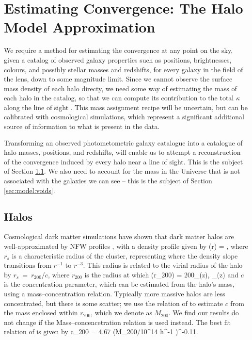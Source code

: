 \documentclass[useAMS,usenatbib]{mn2e}
\begin{document}



\section{Estimating Convergence: The Halo Model Approximation}
\label{sec:model}

We require a method for estimating the
convergence at any point on the sky, given a catalog of observed
galaxy properties such as positions, brightnesses, colours, and
possibly stellar masses and redshifts, for every galaxy in the field of
the lens, down to some magnitude limit. Since we cannot observe the
surface mass density of each halo directy, we need some way of
estimating the mass of each halo in the catalog, so that we can compute
its contribution to the total $\kappa$ along the line of sight \citep[as
in \eg][]{GunnarssonEtal2006,WongEtal2011,KarpenkaEtal2012}. 
This mass assignment recipe
will be uncertain, but can be calibrated with cosmological simulations, which
represent a significant additional source of information to what is present in
the data.

Transforming an observed photometometric galaxy catalogue into a 
catalogue of halo masses, positions, and redshifts, will enable us to
attempt a reconstruction of the convergence induced by every halo near a
line of sight. This is the subject of Section \ref{sec:model:halos}. We
also need to account for the mass in the Universe that is not associated
with the galaxies we can see -- this is the subject of Section
\ref{sec:model:voids}. 



\subsection{Halos}
\label{sec:model:halos}

Cosmological dark matter simulations have shown that dark matter
halos are well-approximated by NFW profiles \citep{NFW}, with a density
profile given by
\be\label{eq:rhonfw}
\rho(r) = 
,
\ee
where $r_{s}$ is a characteristic radius of the cluster, representing where
the density slope transitions from $r^{-1}$ to $r^{-3}$. This radius is related
to the virial radius of the halo by $r_{s}~=~r_{200}/c$, where $r_{200}$ is the radius at 
which 
\be
\rho(r_{200}) = 200\rho_{{}}(z),  \rho_{}(z) \equiv {}
\ee
and $c$ is the concentration parameter, which can be estimated from the halo's mass,
using a mass--concentration relation. Typically more massive halos are less concentrated,
but there is some scatter; we use the relation of \citet{Neto2007} to estimate $c$
from the mass enclosed within $r_{200}$, which we denote as $M_{200}$. We find our results do not change if the \citet{MaccioEtal2008} Mass--concencetration relation is used instead. The best fit relation of \citet{Neto2007} is given by
\be
c_{200} = 4.67 (M_{200}/10^{14} h^{-1} \Msun)^{-0.11}.
\ee
\end{document}
